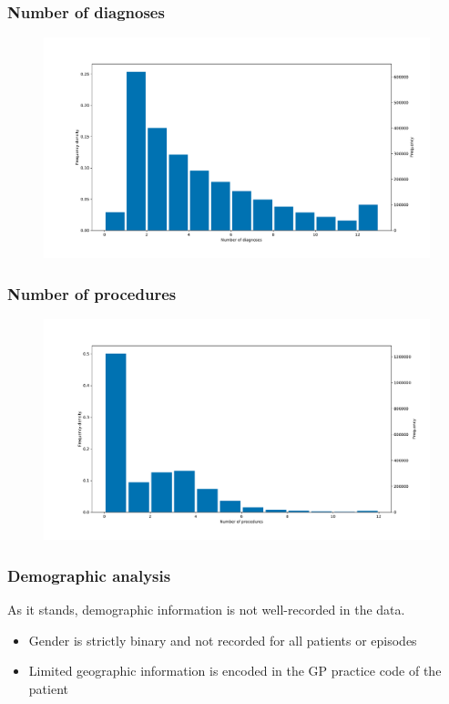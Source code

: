 \documentclass{beamer}
\begin{document}
\begin{frame}
    \frametitle{Number of diagnoses}

    \begin{figure}
    \includegraphics[width=\linewidth]{./img/diag_no_hist.pdf}
    \end{figure}
\end{frame}

\begin{frame}
    \frametitle{Number of procedures}

    \begin{figure}
    \includegraphics[width=\linewidth]{./img/proc_no_hist.pdf}
    \end{figure}
\end{frame}

\begin{frame}
    \frametitle{Demographic analysis}

    As it stands, demographic information is not well-recorded in the data.

    \vspace{10pt}
    \begin{itemize}
        \pause%
        \item Gender is strictly binary and not recorded for all patients or
            episodes
        \pause%
        \item Limited geographic information is encoded in the GP practice code
            of the patient
    \end{itemize}
\end{frame}
\end{document}
